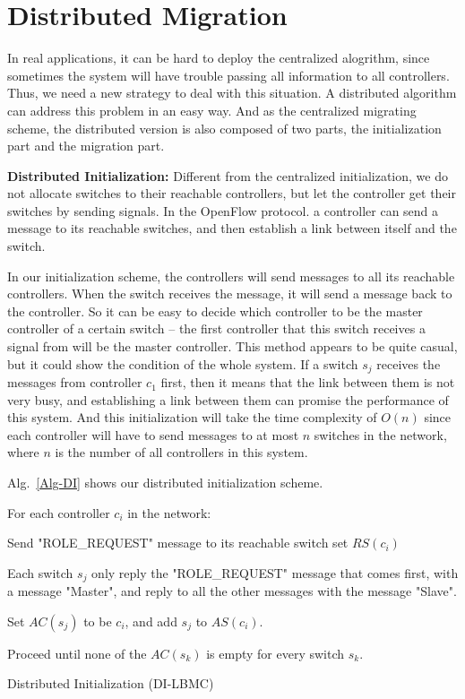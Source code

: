 \vspace{-4mm}

\section{Distributed Migration}
In real applications, it can be hard to deploy the centralized alogrithm, since sometimes the system will have trouble passing all information to all controllers. Thus, we need a new strategy to deal with this situation. A distributed algorithm can address this problem in an easy way. And as the centralized migrating scheme, the distributed version is also composed of two parts, the initialization part and the migration part.

\textbf{Distributed Initialization:}
Different from the centralized initialization, we do not allocate switches to their reachable controllers, but let the controller get their switches by sending signals. In the OpenFlow protocol. a controller can send a message to its reachable switches, and then establish a link between itself and the switch.

In our initialization scheme, the controllers will send messages to all its reachable controllers. When the switch receives the message, it will send a message back to the controller. So it can be easy to decide which controller to be the master controller of a certain switch -- the first controller that this switch receives a signal from will be the master controller. This method appears to be quite casual, but it could show the condition of the whole system. If a switch $s_j$ receives the messages from controller $c_1$ first, then it means that the link between them is not very busy, and establishing a link between them can promise the performance of this system. And this initialization will take the time complexity of $O(n)$ since each controller will have to send messages to at most $n$ switches in the network, where $n$ is the number of all controllers in this system.

Alg.~\ref{Alg-DI} shows our distributed initialization scheme.

\vspace{-4mm}
\begin{algorithm}

For each controller $c_i$ in the network:

Send "ROLE\_REQUEST" message to its reachable switch set $RS(c_i)$

Each switch $s_j$ only reply the "ROLE\_REQUEST" message that comes first, with a message "Master", and reply to all the other messages with the message "Slave".

Set $AC(s_j)$ to be $c_i$, and add $s_j$ to $AS(c_i)$.

Proceed until none of the $AC(s_k)$ is empty for every switch $s_k$.
\caption{Distributed Initialization (DI-LBMC)}\label{Alg-DI}
\end{algorithm}
\vspace{-4mm}


